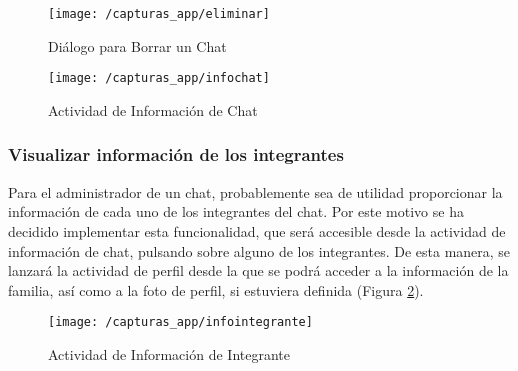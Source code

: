 \begin{figure}[!h]
	\centering
	\begin{minipage}{.5\textwidth}
		\centering
		\texttt{[image: /capturas\_app/eliminar]}
		\caption{Diálogo para Borrar un Chat}
		\label{fig:borrarchat}
	\end{minipage}%
	\begin{minipage}{.5\textwidth}
		\centering
		\texttt{[image: /capturas\_app/infochat]}
		\caption{Actividad de Información de Chat}
		\label{fig:infochat}
	\end{minipage}
\end{figure}

\clearpage

\subsubsection{Visualizar información de los integrantes}
Para el administrador de un chat, probablemente sea de utilidad proporcionar la información de cada uno de los integrantes del chat. Por este motivo se ha decidido implementar esta funcionalidad, que será accesible desde la actividad de información de chat, pulsando sobre alguno de los integrantes. De esta manera, se lanzará la actividad de perfil desde la que se podrá acceder a la información de la familia, así como a la foto de perfil, si estuviera definida (Figura \ref{fig:infointegrante}).

\begin{figure}[!h]
	\begin{center}
		\texttt{[image: /capturas\_app/infointegrante]}
		\caption{Actividad de Información de Integrante}
		\label{fig:infointegrante}
	\end{center}
\end{figure}








